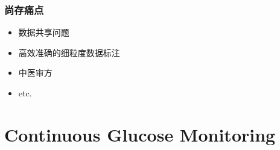 
\begin{frame}
\frametitle{尚存痛点}

\begin{itemize}
    \item \fl 数据共享问题
    \vspace{0.6em}
    \item {\color{green}高效}{\color{pink}准确}的{\color{red}细粒度}数据标注
    \vspace{0.6em}
    \item 中医审方
    \vspace{0.6em}
    \item etc.
\end{itemize}

\end{frame}


\section[CGM]{Continuous Glucose Monitoring}


